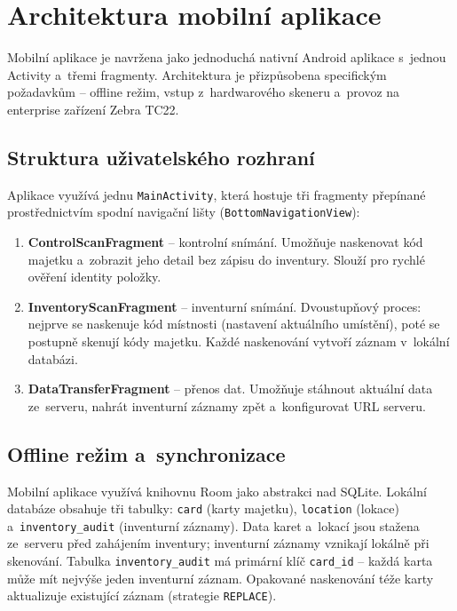 \section{Architektura mobilní aplikace}\label{sec:mobile-arch}

Mobilní aplikace je navržena jako jednoduchá nativní Android aplikace s~jednou Activity a~třemi fragmenty. Architektura je přizpůsobena specifickým požadavkům -- offline režim, vstup z~hardwarového skeneru a~provoz na enterprise zařízení Zebra TC22.

\subsection{Struktura uživatelského rozhraní}

Aplikace využívá jednu \texttt{MainActivity}, která hostuje tři fragmenty přepínané prostřednictvím spodní navigační lišty (\texttt{BottomNavigationView}):

\begin{enumerate}
	\item \textbf{ControlScanFragment} -- kontrolní snímání. Umožňuje naskenovat kód majetku a~zobrazit jeho detail bez zápisu do inventury. Slouží pro rychlé ověření identity položky.
	\item \textbf{InventoryScanFragment} -- inventurní snímání. Dvoustupňový proces: nejprve se naskenuje kód místnosti (nastavení aktuálního umístění), poté se postupně skenují kódy majetku. Každé naskenování vytvoří záznam v~lokální databázi.
	\item \textbf{DataTransferFragment} -- přenos dat. Umožňuje stáhnout aktuální data ze~serveru, nahrát inventurní záznamy zpět a~konfigurovat URL serveru.
\end{enumerate}

\subsection{Offline režim a~synchronizace}

Mobilní aplikace využívá knihovnu Room jako abstrakci nad SQLite. Lokální databáze obsahuje tři tabulky: \texttt{card} (karty majetku), \texttt{location} (lokace) a~\texttt{inventory\_audit} (inventurní záznamy). Data karet a~lokací jsou stažena ze~serveru před zahájením inventury; inventurní záznamy vznikají lokálně při skenování. Tabulka \texttt{inventory\_audit} má primární klíč \texttt{card\_id} -- každá karta může mít nejvýše jeden inventurní záznam. Opakované naskenování téže karty aktualizuje existující záznam (strategie \texttt{REPLACE}).

